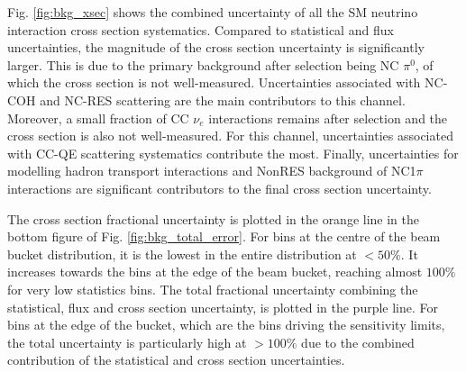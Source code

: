 Fig. \ref{fig:bkg_xsec} shows the combined uncertainty of all the SM neutrino interaction cross section systematics.
Compared to statistical and flux uncertainties, the magnitude of the cross section uncertainty is significantly larger.
This is due to the primary background after selection being NC $\pi^0$, of which the cross section is not well-measured.  
Uncertainties associated with NC-COH and NC-RES scattering are the main contributors to this channel.
Moreover, a small fraction of CC $\nu_e$ interactions remains after selection and the cross section is also not well-measured.
For this channel, uncertainties associated with CC-QE scattering systematics contribute the most.
Finally, uncertainties for modelling hadron transport interactions and NonRES background of NC1$\pi$ interactions are significant contributors to the final cross section uncertainty.

The cross section fractional uncertainty is plotted in the orange line in the bottom figure of Fig. \ref{fig:bkg_total_error}.
For bins at the centre of the beam bucket distribution, it is the lowest in the entire distribution at $< 50\%$.
It increases towards the bins at the edge of the beam bucket, reaching almost $100 \%$ for very low statistics bins.
The total fractional uncertainty combining the statistical, flux and cross section uncertainty, is plotted in the purple line.
For bins at the edge of the bucket, which are the bins driving the sensitivity limits, the total uncertainty is particularly high at $> 100\%$ due to the combined contribution of the statistical and cross section uncertainties.

